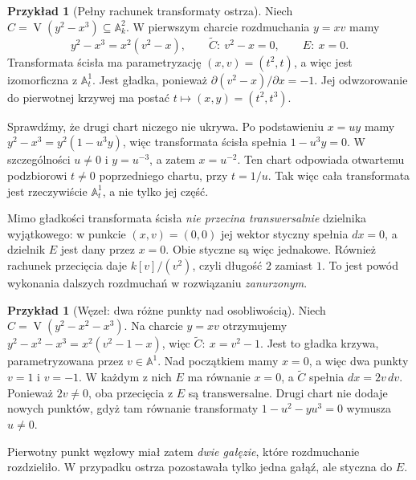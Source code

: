 \documentclass[11pt,a4paper,openany]{report}
\numberwithin{equation}{section}
\theoremstyle{plain}
\theoremstyle{definition}
\newtheorem{przyklad}[twierdzenie]{Przykład}
\theoremstyle{remark}
\newcommand{\A}{\mathbb A}
\newcommand{\V}{\operatorname V}
\begin{document}
\begin{przyklad}[Pełny rachunek transformaty ostrza]
\label{prz:ga5-cusp}
Niech $C=\V(y^2-x^3)\subseteq\A^2_k$. W pierwszym
charcie rozdmuchania $y=xv$ mamy
\[
 y^2-x^3=x^2(v^2-x),\qquad
 \widetilde C:\ v^2-x=0,\qquad E:\ x=0.
\]
Transformata ścisła ma parametryzację
$(x,v)=(t^2,t)$, a więc jest izomorficzna z $\A^1_t$.
Jest gładka, ponieważ $\partial(v^2-x)/\partial x=-1$.
Jej odwzorowanie do pierwotnej krzywej ma postać
$t\mapsto(x,y)=(t^2,t^3)$.

Sprawdźmy, że drugi chart niczego nie ukrywa.
Po podstawieniu $x=uy$ mamy
$y^2-x^3=y^2(1-u^3y)$, więc transformata ścisła
spełnia $1-u^3y=0$. W szczególności $u\ne0$ i
$y=u^{-3}$, a zatem $x=u^{-2}$. Ten chart odpowiada
otwartemu podzbiorowi $t\ne0$ poprzedniego chartu,
przy $t=1/u$. Tak więc cała transformata jest
rzeczywiście $\A^1_t$, a nie tylko jej część.

Mimo gładkości transformata ścisła \emph{nie przecina
transwersalnie} dzielnika wyjątkowego: w punkcie
$(x,v)=(0,0)$ jej wektor styczny spełnia $dx=0$,
a dzielnik $E$ jest dany przez $x=0$. Obie styczne
są więc jednakowe. Również rachunek przecięcia
daje $k[v]/(v^2)$, czyli długość $2$ zamiast $1$.
To jest powód wykonania dalszych rozdmuchań
w rozwiązaniu \emph{zanurzonym}.
\end{przyklad}

\begin{przyklad}[Węzeł: dwa różne punkty nad osobliwością]
\label{prz:ga5-node}
Niech $C=\V(y^2-x^2-x^3)$. Na charcie $y=xv$
otrzymujemy
$y^2-x^2-x^3=x^2(v^2-1-x)$, więc
$\widetilde C:\ x=v^2-1$. Jest to gładka krzywa,
parametryzowana przez $v\in\A^1$.
Nad początkiem mamy $x=0$, a więc dwa punkty
$v=1$ i $v=-1$. W każdym z nich $E$ ma równanie
$x=0$, a $\widetilde C$ spełnia $dx=2v\,dv$.
Ponieważ $2v\ne0$, oba przecięcia z $E$ są
transwersalne. Drugi chart nie dodaje nowych punktów,
gdyż tam równanie transformaty
$1-u^2-yu^3=0$ wymusza $u\ne0$.

Pierwotny punkt węzłowy miał zatem \emph{dwie gałęzie},
które rozdmuchanie rozdzieliło. W przypadku ostrza
pozostawała tylko jedna gałąź, ale styczna do $E$.
\end{przyklad}
\end{document}
